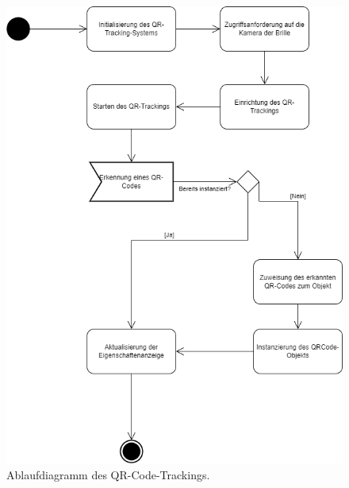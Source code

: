 \begin{figure}[H]
\centering
\includegraphics[scale=0.5, angle=0]{images/QRAblauf}
\caption{Ablaufdiagramm des QR-Code-Trackings.}
\label{fig:qrtracking}
\end{figure}

